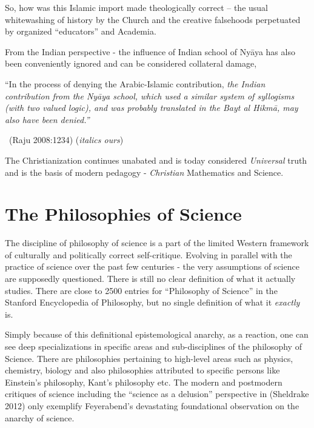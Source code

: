 So, how was this Islamic import made theologically correct – the usual whitewashing of history by the Church and the creative falsehoods perpetuated by organized “educators” and Academia.

From the Indian perspective - the influence of Indian school of Nyāya has also been conveniently ignored and can be considered collateral damage,

\begin{myquote}
“In the process of denying the Arabic-Islamic contribution, \textit{the Indian contribution from the Nyāya school, which used a similar system of syllogisms (with two valued logic), and was probably translated in the Bayt al Hikmā, may also have been denied.”} 

\vskip -5pt

~\hfill (Raju 2008:1234) (\textit{italics ours})
\end{myquote}

The Christianization continues unabated and is today considered \textit{Universal} truth and is the basis of modern pedagogy - \textit{Christian} Mathematics and Science.


\section*{The Philosophies of Science}

The discipline of philosophy of science is a part of the limited Western framework of culturally and politically correct self-critique. Evolving in parallel with the practice of science over the past few centuries - the very assumptions of science are supposedly questioned. There is still no clear definition of what it actually studies. There are close to 2500 entries for “Philosophy of Science” in the Stanford Encyclopedia of Philosophy, but no single definition of what it \textit{exactly} is.

Simply because of this definitional epistemological anarchy, as a reaction, one can see deep specializations in specific areas and sub-disci\-plines of the philosophy of Science. There are philosophies pertaining to high-level areas such as physics, chemistry, biology and also philosophies attributed to specific persons like Einstein’s philosophy, Kant’s philosophy etc. The modern and postmodern critiques of science including the “science as a delusion” perspective in (Sheldrake 2012) only exemplify Feyerabend’s devastating foundational observation on the anarchy of science.

